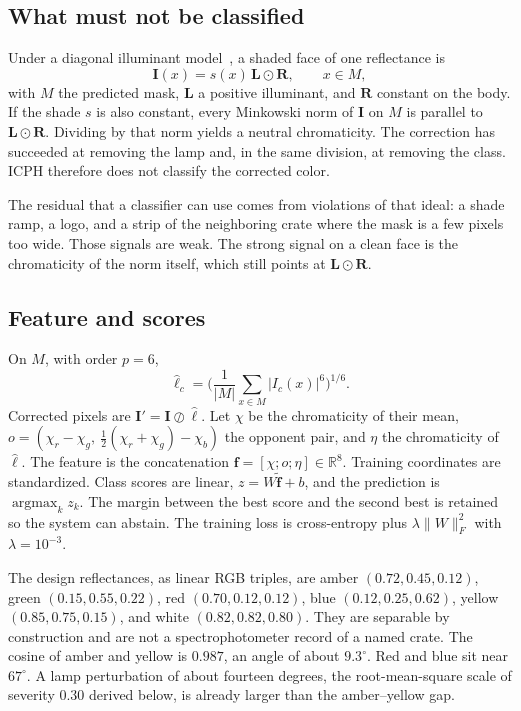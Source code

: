\documentclass[10pt]{article}
\begin{document}
\subsection{What must not be classified}
Under a diagonal illuminant model~\cite{gijsenij2011}, a shaded face of one reflectance is
\begin{equation}
\mathbf{I}(x)=s(x)\,\mathbf{L}\odot\mathbf{R},\qquad x\in M,
\label{eq:diag}
\end{equation}
with $M$ the predicted mask, $\mathbf{L}$ a positive illuminant, and $\mathbf{R}$ constant on the body. If the shade $s$ is also constant, every Minkowski norm of $\mathbf{I}$ on $M$ is parallel to $\mathbf{L}\odot\mathbf{R}$. Dividing by that norm yields a neutral chromaticity. The correction has succeeded at removing the lamp and, in the same division, at removing the class. ICPH therefore does not classify the corrected color.

The residual that a classifier can use comes from violations of that ideal: a shade ramp, a logo, and a strip of the neighboring crate where the mask is a few pixels too wide. Those signals are weak. The strong signal on a clean face is the chromaticity of the norm itself, which still points at $\mathbf{L}\odot\mathbf{R}$.

\subsection{Feature and scores}
On $M$, with order $p=6$,
\begin{equation}
\hat\ell_c=\Big(\frac{1}{|M|}\sum_{x\in M}|I_c(x)|^6\Big)^{1/6}.
\label{eq:sog}
\end{equation}
Corrected pixels are $\mathbf{I}'=\mathbf{I}\oslash\hat\ell$. Let $\chi$ be the chromaticity of their mean, $o=(\chi_r-\chi_g,\ \tfrac12(\chi_r+\chi_g)-\chi_b)$ the opponent pair, and $\eta$ the chromaticity of $\hat\ell$. The feature is the concatenation $\mathbf{f}=[\chi;o;\eta]\in\mathbb{R}^{8}$. Training coordinates are standardized. Class scores are linear, $z=W\tilde{\mathbf{f}}+b$, and the prediction is $\operatorname{argmax}_k z_k$. The margin between the best score and the second best is retained so the system can abstain. The training loss is cross-entropy plus $\lambda\|W\|_F^2$ with $\lambda=10^{-3}$.

The design reflectances, as linear RGB triples, are amber $(0.72,0.45,0.12)$, green $(0.15,0.55,0.22)$, red $(0.70,0.12,0.12)$, blue $(0.12,0.25,0.62)$, yellow $(0.85,0.75,0.15)$, and white $(0.82,0.82,0.80)$. They are separable by construction and are not a spectrophotometer record of a named crate. The cosine of amber and yellow is $0.987$, an angle of about $9.3^{\circ}$. Red and blue sit near $67^{\circ}$. A lamp perturbation of about fourteen degrees, the root-mean-square scale of severity $0.30$ derived below, is already larger than the amber--yellow gap.
\end{document}
